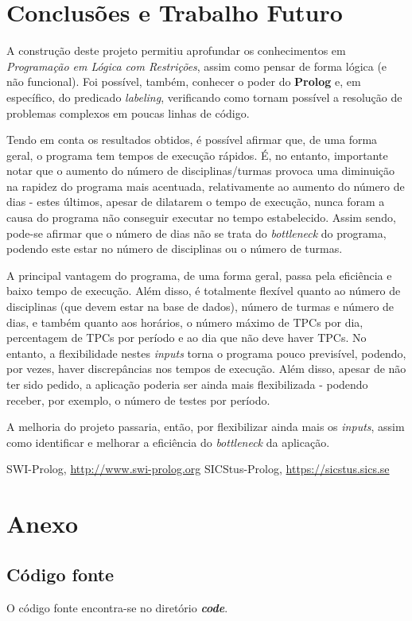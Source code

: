 \documentclass{llncs}
\begin{document}
\section{Conclusões e Trabalho Futuro}
A construção deste projeto permitiu aprofundar os conhecimentos em \textit{Programação em Lógica com Restrições}, assim como pensar de forma lógica (e não funcional). Foi possível, também, conhecer o poder do \textbf{Prolog} e, em específico, do predicado \textit{labeling}, verificando como tornam possível a resolução de problemas complexos em poucas linhas de código.\par
Tendo em conta os resultados obtidos, é possível afirmar que, de uma forma geral, o programa tem tempos de execução rápidos. É, no entanto, importante notar que o aumento do número de disciplinas/turmas provoca uma diminuição na rapidez do programa mais acentuada, relativamente ao aumento do número de dias - estes últimos, apesar de dilatarem o tempo de execução, nunca foram a causa do programa não conseguir executar no tempo estabelecido.\newline
Assim sendo, pode-se afirmar que o número de dias não se trata do \textit{bottleneck} do programa, podendo este estar no número de disciplinas ou o número de turmas.\par
A principal vantagem do programa, de uma forma geral, passa pela eficiência e baixo tempo de execução. Além disso, é totalmente flexível quanto ao número de disciplinas (que devem estar na base de dados), número de turmas e número de dias, e também quanto aos horários, o número máximo de TPCs por dia, percentagem de TPCs por período e ao dia que não deve haver TPCs.\newline
No entanto, a flexibilidade nestes \textit{inputs} torna o programa pouco previsível, podendo, por vezes, haver discrepâncias nos tempos de execução. Além disso, apesar de não ter sido pedido, a aplicação poderia ser ainda mais flexibilizada - podendo receber, por exemplo, o número de testes por período.\par
A melhoria do projeto passaria, então, por flexibilizar ainda mais os \textit{inputs}, assim como identificar e melhorar a eficiência do \textit{bottleneck} da aplicação. 



%
%
\begin{thebibliography}{5}
%
SWI-Prolog,
\url{http://www.swi-prolog.org}
SICStus-Prolog,
\url{https://sicstus.sics.se}


\end{thebibliography}
\clearpage

\section*{Anexo}
\subsection*{Código fonte}
O código fonte encontra-se no diretório \textit{\textbf{code}}.
\end{document}
